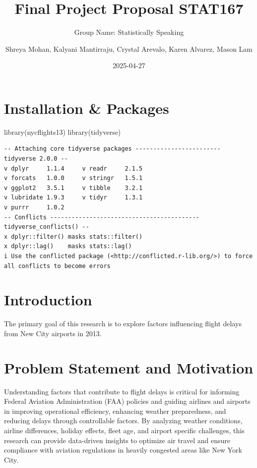 \documentclass[
  10pt,
  letterpaper,
  DIV=11,
  numbers=noendperiod]{scrartcl}
\title{Final Project Proposal STAT167}
\author{Group Name: Statistically Speaking \and Shreya Mohan, Kalyani
Mantirraju, Crystal Arevalo, Karen Alvarez, Mason Lam}
\date{2025-04-27}
\newenvironment{Shaded}{\begin{snugshade}}{\end{snugshade}}
\newcommand{\FunctionTok}[1]{\textcolor[rgb]{0.28,0.35,0.67}{#1}}
\newcommand{\NormalTok}[1]{\textcolor[rgb]{0.00,0.23,0.31}{#1}}
\begin{document}
\maketitle


\section{Installation \& Packages}\label{installation-packages}

\begin{Shaded}
\begin{Highlighting}[numbers=left,,]
\FunctionTok{library}\NormalTok{(nycflights13)}
\FunctionTok{library}\NormalTok{(tidyverse)}
\end{Highlighting}
\end{Shaded}

\begin{verbatim}
-- Attaching core tidyverse packages ------------------------ tidyverse 2.0.0 --
v dplyr     1.1.4     v readr     2.1.5
v forcats   1.0.0     v stringr   1.5.1
v ggplot2   3.5.1     v tibble    3.2.1
v lubridate 1.9.3     v tidyr     1.3.1
v purrr     1.0.2     
-- Conflicts ------------------------------------------ tidyverse_conflicts() --
x dplyr::filter() masks stats::filter()
x dplyr::lag()    masks stats::lag()
i Use the conflicted package (<http://conflicted.r-lib.org/>) to force all conflicts to become errors
\end{verbatim}

\section{Introduction}\label{introduction}

The primary goal of this research is to explore factors influencing
flight delays from New City airports in 2013.

\section{Problem Statement and
Motivation}\label{problem-statement-and-motivation}

Understanding factors that contribute to flight delays is critical for
informing Federal Aviation Administration (FAA) policies and guiding
airlines and airports in improving operational efficiency, enhancing
weather preparedness, and reducing delays through controllable factors.
By analyzing weather conditions, airline differences, holiday effects,
fleet age, and airport specific challenges, this research can provide
data-driven insights to optimize air travel and ensure compliance with
aviation regulations in heavily congested areas like New York City.
\end{document}
